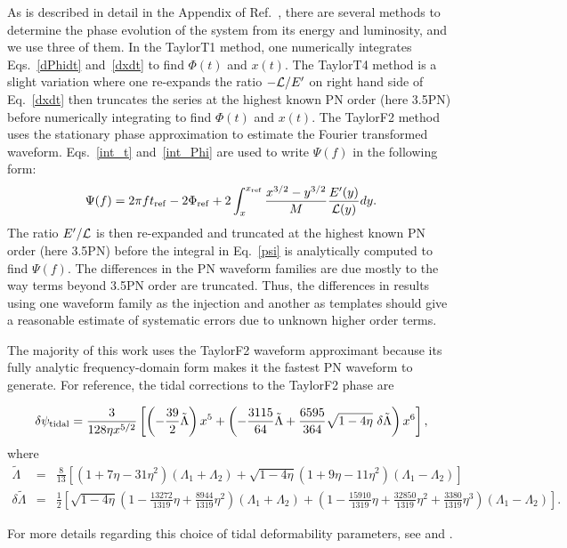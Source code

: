 \documentclass[twocolumn,prd,amssymb,aps,nofootinbib,showpacs,epsf]{revtex4}
\begin{document}
As is described in detail in the Appendix of Ref.~\cite{WadeCreightonOchsner2014}, there are several methods to determine the phase evolution of the system from its energy and luminosity, and we use three of them.  In the TaylorT1 method, one numerically integrates Eqs.~\eqref{dPhidt} and~\eqref{dxdt} to find $\Phi(t)$ and $x(t)$. The TaylorT4 method is a slight variation where one re-expands the ratio $-{\cal L}/E^\prime$ on right hand side of Eq.~\eqref{dxdt} then truncates the series at the highest known PN order (here 3.5PN) before numerically integrating to find $\Phi(t)$ and $x(t)$. The TaylorF2 method uses the stationary phase approximation to estimate the Fourier transformed waveform.  Eqs.~\eqref{int_t} and~\eqref{int_Phi} are used to write $\Psi(f)$ in the following form:
\begin{equation}
\label{psi}
\Psi(f)=2\pi f t_{\rm ref} - 2\Phi_{\rm ref} + 2\int_x^{x_{\rm ref}}\frac{x^{3/2} - y^{3/2}}{M}\frac{E^\prime(y)}{{\cal L}(y)}dy.
\end{equation}
The ratio $E^\prime/{\cal L}$ is then re-expanded and truncated at the highest known PN order (here 3.5PN) before the integral in Eq.~\eqref{psi} is analytically computed to find $\Psi(f)$.  The differences in the PN waveform families are due mostly to the way terms beyond 3.5PN order are truncated.  Thus, the differences in results using one waveform family as the injection and another as templates should give a reasonable estimate of systematic errors due to unknown higher order terms.

The majority of this work uses the TaylorF2 waveform approximant because its fully analytic frequency-domain form makes it the fastest PN waveform to generate.  For reference, the tidal corrections to the TaylorF2 phase are
\begin{widetext}
\begin{equation}
\delta\psi_{\rm tidal}=\frac{3}{128\eta x^{5/2}}\left[ \left(-\frac{39}{2}\tilde{\Lambda}\right)x^5+ \left(-\frac{3115}{64}\tilde{\Lambda}+\frac{6595}{364}\sqrt{1-4\eta}\mbox{ }\delta\tilde{\Lambda}\right)x^6 \right],
\end{equation}
where
\begin{eqnarray}
\label{LT}
\tilde{\Lambda}&=&\frac{8}{13}\left[\left(1+7\eta-31\eta^2\right)\left(\Lambda_1+\Lambda_2\right)+\sqrt{1-4\eta}\left(1+9\eta-11\eta^2\right)\left(\Lambda_1-\Lambda_2\right)\right]\\
\label{dLT}
\delta\tilde{\Lambda}&=&\frac{1}{2}\left[\sqrt{1-4\eta}\left(1-\frac{13272}{1319}\eta+\frac{8944}{1319}\eta^2\right)\left(\Lambda_1+\Lambda_2\right) + \left(1-\frac{15910}{1319}\eta+\frac{32850}{1319}\eta^2+\frac{3380}{1319}\eta^3\right)\left(\Lambda_1-\Lambda_2\right)\right].
\end{eqnarray}
\end{widetext}
For more details regarding this choice of tidal deformability parameters, see \cite{WadeCreightonOchsner2014} and \cite{Favata2014}.
\end{document}
